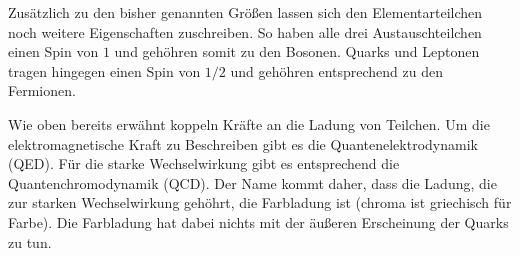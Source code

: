 Zus\"atzlich zu den bisher genannten Gr\"o{\ss}en lassen sich den Elementarteilchen noch weitere Eigenschaften zuschreiben. So haben alle drei Austauschteilchen einen Spin von $1$ und geh\"ohren somit zu den Bosonen. Quarks und Leptonen tragen hingegen einen Spin von $1/2$ und geh\"ohren entsprechend zu den Fermionen.

Wie oben bereits erw\"ahnt koppeln Kr\"afte an die Ladung von Teilchen. Um die elektromagnetische Kraft zu Beschreiben gibt es die Quantenelektrodynamik (QED). F\"ur die starke Wechselwirkung gibt es entsprechend die Quantenchromodynamik (QCD). Der Name kommt daher, dass die Ladung, die zur starken Wechselwirkung geh\"ohrt, die Farbladung ist (chroma ist griechisch für Farbe). Die Farbladung hat dabei nichts mit der \"au{\ss}eren Erscheinung der Quarks zu tun.